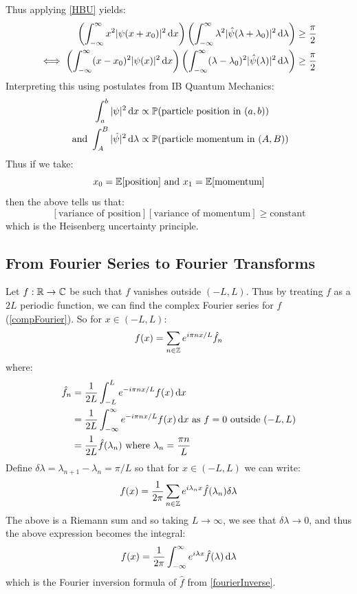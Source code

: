 \documentclass[../main.tex]{subfiles}
\begin{document}
Thus applying \cref{HBU} yields:
\begin{align*}
  \left(\int_{-\infty}^{\infty} x^2 |\psi(x + x_0)|^2 \d{x}\right)\left(\int_{-\infty}^{\infty} \lambda^2 |\hat{\psi}(\lambda + \lambda_0)|^2 \d{\lambda}\right) \geq \frac{\pi}{2} \\
  \iff \left(\int_{-\infty}^{\infty} (x - x_0)^2 |\psi(x)|^2 \d{x}\right)\left(\int_{-\infty}^{\infty} (\lambda - \lambda_0)^2 |\hat{\psi}(\lambda)|^2 \d{\lambda}\right) \geq \frac{\pi}{2} \\
\end{align*}
Interpreting this using postulates from IB Quantum Mechanics:
\begin{align*}
  \int_{a}^{b} |\psi|^2 \d{x} &\propto \P(\text{particle position in $(a, b)$}) \\
  \text{ and } \int_{A}^{B} |\hat{\psi}|^2 \d{\lambda} &\propto \P(\text{particle momentum in $(A, B)$})
\end{align*}
Thus if we take:
\[
  x_0 = \mathbb{E}[\text{position}] \text{ and } x_1 = \mathbb{E}[\text{momentum}]
\]
then the above tells us that:
\[
  [\text{variance of position}][\text{variance of momentum}] \geq \text{constant}
\]
which is the Heisenberg uncertainty principle.
\subsection{From Fourier Series to Fourier Transforms}
Let $f: \mathbb{R} \to \mathbb{C}$ be such that $f$ vanishes outside $(-L, L)$.
Thus by treating $f$ as a $2L$ periodic function, we can find the complex Fourier series for $f$ (\cref{compFourier}).
So for $x \in (-L, L)$:
\[
  f(x) = \sum_{n \in \mathbb{Z}} e^{i \pi n x / L} \hat{f}_n
\]
where:
\begin{align*}
  \hat{f}_n &= \frac{1}{2L} \int_{-L}^{L} e^{-i \pi n x / L} f(x) \d{x} \\
            &= \frac{1}{2L} \int_{-\infty}^{\infty} e^{-i \pi n x / L} f(x) \d{x} \text{ as $f = 0$ outside $(-L, L)$} \\
            &= \frac{1}{2L} \hat{f}(\lambda_n) \text{ where } \lambda_n = \frac{\pi n}{L}
\end{align*}
Define $\delta \lambda = \lambda_{n + 1} - \lambda_n = \pi / L$ so that for $x \in (-L, L)$ we can write:
\[
  f(x) = \frac{1}{2\pi} \sum_{n \in \mathbb{Z}} e^{i \lambda_n x} \hat{f}(\lambda_n) \delta \lambda
\]
The above is a Riemann sum and so taking $L \to \infty$, we see that $\delta \lambda \to 0$, and thus the above expression becomes the integral:
\[
  f(x) = \frac{1}{2\pi} \int_{-\infty}^{\infty} e^{i \lambda x} \hat{f}(\lambda) \d{\lambda}
\]
which is the Fourier inversion formula of $\hat{f}$ from \cref{fourierInverse}.
\end{document}
